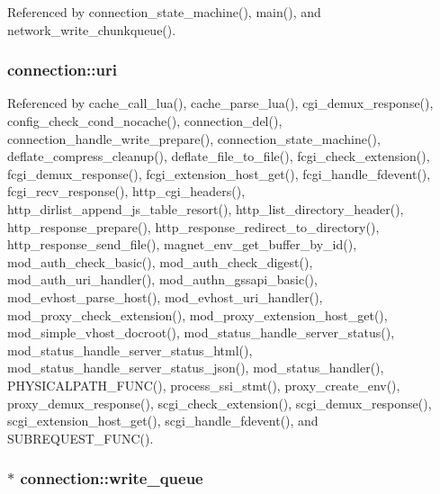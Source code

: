 Referenced by connection\-\_\-state\-\_\-machine(), main(), and network\-\_\-write\-\_\-chunkqueue().

\hypertarget{structconnection_a92531d3094bf5ce3af5107506702067c}{
\subsubsection[{uri}]{ connection\-::uri}}\label{structconnection_a92531d3094bf5ce3af5107506702067c}


Referenced by cache\-\_\-call\-\_\-lua(), cache\-\_\-parse\-\_\-lua(), cgi\-\_\-demux\-\_\-response(), config\-\_\-check\-\_\-cond\-\_\-nocache(), connection\-\_\-del(), connection\-\_\-handle\-\_\-write\-\_\-prepare(), connection\-\_\-state\-\_\-machine(), deflate\-\_\-compress\-\_\-cleanup(), deflate\-\_\-file\-\_\-to\-\_\-file(), fcgi\-\_\-check\-\_\-extension(), fcgi\-\_\-demux\-\_\-response(), fcgi\-\_\-extension\-\_\-host\-\_\-get(), fcgi\-\_\-handle\-\_\-fdevent(), fcgi\-\_\-recv\-\_\-response(), http\-\_\-cgi\-\_\-headers(), http\-\_\-dirlist\-\_\-append\-\_\-js\-\_\-table\-\_\-resort(), http\-\_\-list\-\_\-directory\-\_\-header(), http\-\_\-response\-\_\-prepare(), http\-\_\-response\-\_\-redirect\-\_\-to\-\_\-directory(), http\-\_\-response\-\_\-send\-\_\-file(), magnet\-\_\-env\-\_\-get\-\_\-buffer\-\_\-by\-\_\-id(), mod\-\_\-auth\-\_\-check\-\_\-basic(), mod\-\_\-auth\-\_\-check\-\_\-digest(), mod\-\_\-auth\-\_\-uri\-\_\-handler(), mod\-\_\-authn\-\_\-gssapi\-\_\-basic(), mod\-\_\-evhost\-\_\-parse\-\_\-host(), mod\-\_\-evhost\-\_\-uri\-\_\-handler(), mod\-\_\-proxy\-\_\-check\-\_\-extension(), mod\-\_\-proxy\-\_\-extension\-\_\-host\-\_\-get(), mod\-\_\-simple\-\_\-vhost\-\_\-docroot(), mod\-\_\-status\-\_\-handle\-\_\-server\-\_\-status(), mod\-\_\-status\-\_\-handle\-\_\-server\-\_\-status\-\_\-html(), mod\-\_\-status\-\_\-handle\-\_\-server\-\_\-status\-\_\-json(), mod\-\_\-status\-\_\-handler(), P\-H\-Y\-S\-I\-C\-A\-L\-P\-A\-T\-H\-\_\-\-F\-U\-N\-C(), process\-\_\-ssi\-\_\-stmt(), proxy\-\_\-create\-\_\-env(), proxy\-\_\-demux\-\_\-response(), scgi\-\_\-check\-\_\-extension(), scgi\-\_\-demux\-\_\-response(), scgi\-\_\-extension\-\_\-host\-\_\-get(), scgi\-\_\-handle\-\_\-fdevent(), and S\-U\-B\-R\-E\-Q\-U\-E\-S\-T\-\_\-\-F\-U\-N\-C().

\hypertarget{structconnection_a79b48981e863f483d429bf5b6c1af617}{
\subsubsection[{write\-\_\-queue}]{$\ast$ connection\-::write\-\_\-queue}}\label{structconnection_a79b48981e863f483d429bf5b6c1af617}


